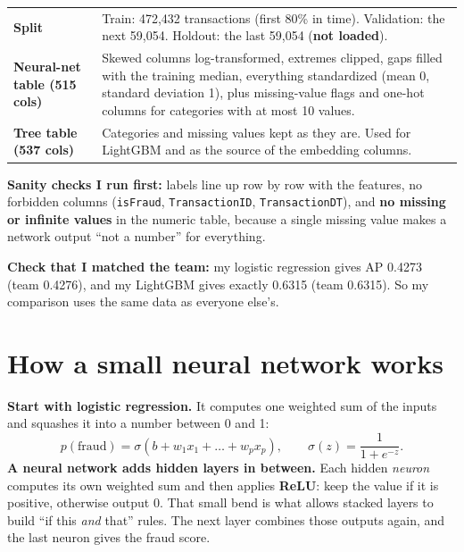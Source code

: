 \documentclass[11pt]{article}
\begin{document}
\begin{center}
\begin{tabularx}{\linewidth}{@{}>{\raggedright\arraybackslash\bfseries}p{3.6cm}L@{}}
\toprule
Split & Train: 472,432 transactions (first 80\% in time). Validation: the next 59,054. Holdout: the last 59,054 (\textbf{not loaded}). \\
Neural-net table (515 cols) & Skewed columns log-transformed, extremes clipped, gaps filled with the training median, everything standardized (mean 0, standard deviation 1), plus missing-value flags and one-hot columns for categories with at most 10 values. \\
Tree table (537 cols) & Categories and missing values kept as they are. Used for LightGBM and as the source of the embedding columns. \\
\bottomrule
\end{tabularx}
\end{center}

\textbf{Sanity checks I run first:} labels line up row by row with the features, no forbidden columns (\texttt{isFraud}, \texttt{TransactionID}, \texttt{TransactionDT}), and \textbf{no missing or infinite values} in the numeric table, because a single missing value makes a network output ``not a number'' for everything.

\textbf{Check that I matched the team:} my logistic regression gives AP 0.4273 (team 0.4276), and my LightGBM gives exactly 0.6315 (team 0.6315). So my comparison uses the same data as everyone else's.

\section{How a small neural network works}
\textbf{Start with logistic regression.} It computes one weighted sum of the inputs and squashes it into a number between 0 and 1:
\[
p(\text{fraud}) = \sigma\!\left(b + w_1x_1 + \dots + w_px_p\right), \qquad \sigma(z) = \frac{1}{1+e^{-z}}.
\]
\textbf{A neural network adds hidden layers in between.} Each hidden \emph{neuron} computes its own weighted sum and then applies \textbf{ReLU}: keep the value if it is positive, otherwise output 0. That small bend is what allows stacked layers to build ``if this \emph{and} that'' rules. The next layer combines those outputs again, and the last neuron gives the fraud score.
\end{document}
